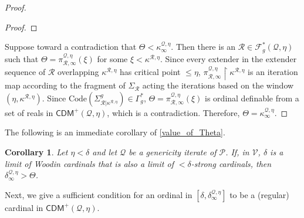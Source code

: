 \documentclass{amsart}
\newtheorem{cor}[dfn]{Corollary}
\newcommand{\uphar}{\mathbin{\upharpoonright}}
\begin{document}
\begin{proof}
\begin{proof}
    \end{proof}
    Suppose toward a contradiction that $\Theta<\kappa^{\mathcal{Q}, \eta}_{\infty}$.
    Then there is an $\mathcal{R}\in\mathcal{F}^*_g(\mathcal{Q}, \eta)$ such that $\Theta=\pi^{\mathcal{Q}, \eta}_{\mathcal{R}, \infty}(\xi)$ for some $\xi<\kappa^{\mathcal{R}, \eta}$.
    Since every extender in the extender sequence of $\mathcal{R}$ overlapping $\kappa^{\mathcal{R}, \eta}$ has critical point $\leq\eta$, $\pi^{\mathcal{Q}, \eta}_{\mathcal{R}, \infty}\uphar\kappa^{\mathcal{R}, \eta}$ is an iteration map according to the fragment of $\Sigma_{\mathcal{R}}$ acting the iterations based on the window $(\eta, \kappa^{\mathcal{R}, \eta})$.
    Since $\mathrm{Code}(\Sigma^g_{\mathcal{R}\vert\kappa^{\mathcal{R}, \eta}})\in\Gamma^*_g$, $\Theta=\pi^{\mathcal{Q}, \eta}_{\mathcal{R}, \infty}(\xi)$ is ordinal definable from a set of reals in $\mathsf{CDM}^+(\mathcal{Q}, \eta)$, which is a contradiction.
    Therefore, $\Theta=\kappa^{\mathcal{Q}, \eta}_{\infty}$.
\end{proof}

The following is an immediate corollary of \cref{value_of_Theta}.

\begin{cor}\label{main_thm_2}
Let $\eta<\delta$ and let $\mathcal{Q}$ be a genericity iterate of $\mathcal{P}$.
If, in $\mathcal{V}$, $\delta$ is a limit of Woodin cardinals that is also a limit of ${<}\delta$-strong cardinals, then $\delta^{\mathcal{Q}, \eta}_{\infty}>\Theta$.
\end{cor}

Next, we give a sufficient condition for an ordinal in $[\delta, \delta^{\mathcal{Q}, \eta}_{\infty}]$ to be a (regular) cardinal in $\mathsf{CDM}^+(\mathcal{Q}, \eta)$.
\end{document}
